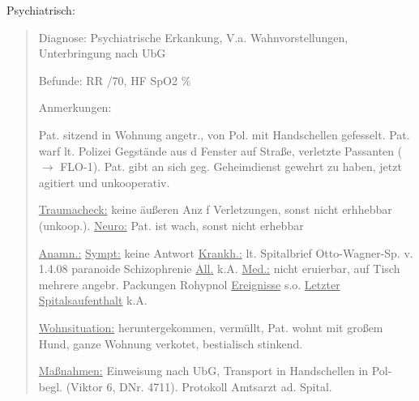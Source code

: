 Psychiatrisch:

\begin{quote}
{\sffamily Diagnose:} {\ttfamily Psychiatrische Erkankung,
V.a. Wahnvorstellungen, Unterbringung nach UbG}

{\sffamily Befunde:} {\sffamily RR} {/70,}
{\sffamily HF} {} {\sffamily SpO2}
{\% }

{\sffamily Anmerkungen:} {\ttfamily Pat. sitzend in Wohnung angetr., von Pol. mit Handschellen
gefesselt. Pat. warf lt. Polizei Gegstände aus d Fenster
auf Straße, verletzte Passanten ($\rightarrow$ FLO-1). Pat.
gibt an sich geg. Geheimdienst gewehrt zu haben,
jetzt agitiert und unkooperativ. 

\underline{Traumacheck:} keine äußeren Anz f Verletzungen,
sonst nicht erhhebbar (unkoop.). \underline{Neuro:} Pat.
ist wach, sonst nicht erhebbar

\underline{Anamn.:} \underline{Sympt:} keine Antwort
\underline{Krankh.:} lt. Spitalbrief Otto-Wagner-Sp. v.
1.4.08 paranoide Schizophrenie \underline{All.} k.A.
\underline{Med.:} nicht eruierbar, auf Tisch mehrere
angebr. Packungen Rohypnol \underline{Ereignisse} s.o.
\underline{Letzter Spitalsaufenthalt} k.A.

\underline{Wohnsituation:} heruntergekommen, vermüllt, Pat.
wohnt mit großem Hund, ganze Wohnung verkotet, bestialisch
stinkend. 

\underline{Maßnahmen:} Einweisung nach UbG, Transport in
Handschellen in Pol-begl. (Viktor 6, DNr. 4711). Protokoll
Amtsarzt ad. Spital.}
\end{quote}

\section{}

\section{}

\section{}